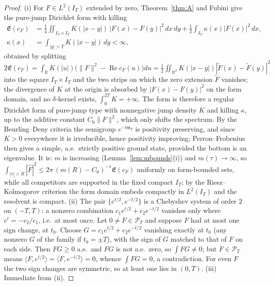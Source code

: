 \documentclass[11pt]{amsart}
\theoremstyle{definition}
\theoremstyle{remark}
\newcommand{\R}{\mathbb R}
\newcommand{\Rel}{\operatorname{Re}}
\newcommand{\PT}{\mathcal P_T}
\newcommand{\IT}{I_T}
\newcommand{\Fh}{\widehat F}
\newcommand{\cF}{c_F}
\newcommand{\Lev}{\mathfrak E}
\newcommand{\mT}{\mathfrak m_T}
\begin{document}
\begin{proof}
(i) For $F\in L^2(\IT)$ extended by zero, Theorem~\ref{thm:A} and Fubini give the pure-jump
Dirichlet form with killing
\[
\begin{aligned}
\Lev(\cF)&=\frac14\iint_{\IT\times\IT}K(|x-y|)\,|F(x)-F(y)|^2\,dx\,dy
+\frac12\int_{\IT}\kappa(x)|F(x)|^2\,dx,\\
\kappa(x)&=\int_{|y|>T}K(|x-y|)\,dy<\infty,
\end{aligned}
\]
obtained by splitting $2\Lev(\cF)=\int_\R K(|u|)\big(\|F\|^2-\Rel\cF(u)\big)du
=\frac12\iint_{\R^2}K(|x-y|)|\widetilde F(x)-\widetilde F(y)|^2$ into the square $\IT\times\IT$
and the two strips on which the zero extension $\widetilde F$ vanishes; the divergence of $K$ at
the origin is absorbed by $|F(x)-F(y)|^2$ on the form domain, and no $\delta$-kernel exists,
$\int_0^{2T}K=+\infty$. The form is therefore a regular Dirichlet form of pure-jump type with
nonnegative jump density $K$ and killing $\kappa$, up to the additive constant $C_0\|F\|^2$,
which only shifts the spectrum. By the Beurling--Deny criteria the semigroup $e^{-t\mT}$ is
positivity preserving, and since $K>0$ everywhere it is irreducible, hence positivity improving;
Perron--Frobenius then gives a simple, a.e.\ strictly positive ground state, provided the bottom
is an eigenvalue. It is: $m$ is increasing (Lemma~\ref{lem:mbounds}(i)) and $m(\tau)\to\infty$, so
$\int_{|\tau|>R}|\Fh|^2\le2\pi\,(m(R)-C_0)^{-1}\Lev(\cF)$ uniformly on form-bounded sets, while all
competitors are supported in the fixed compact $\IT$; by the Riesz--Kolmogorov criterion the form
domain embeds compactly in $L^2(\IT)$ and the resolvent is compact.
(ii) The pair $\{e^{t/2},e^{-t/2}\}$ is a Chebyshev system of order $2$ on $(-T,T)$: a nonzero
combination $c_1e^{t/2}+c_2e^{-t/2}$ vanishes only where $e^{t}=-c_2/c_1$, i.e.\ at most once. Let
$0\ne F\in\PT$ and suppose $F$ had at most one sign change, at $t_0$. Choose
$G=c_1e^{t/2}+c_2e^{-t/2}$ vanishing exactly at $t_0$ (any nonzero $G$ of the family if
$t_0=\pm T$), with the sign of $G$ matched to that of $F$ on each side. Then $FG\ge0$ a.e.\ and
$FG$ is not a.e.\ zero, so $\int FG\ne0$; but $F\in\PT$ means $\langle F,e^{t/2}\rangle=\langle
F,e^{-t/2}\rangle=0$, whence $\int FG=0$, a contradiction. For even $F$ the two sign changes are
symmetric, so at least one lies in $(0,T)$.
(iii) Immediate from (ii).
\end{proof}
\end{document}
